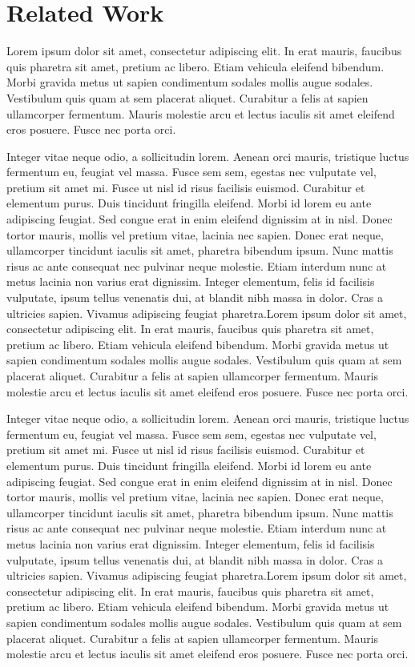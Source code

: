 \section{Related Work}
\label{sec:related_work}

Lorem ipsum dolor sit amet, consectetur adipiscing elit. In erat mauris, faucibus quis pharetra sit amet, pretium ac libero. Etiam vehicula eleifend bibendum. Morbi gravida metus ut sapien condimentum sodales mollis augue sodales. Vestibulum quis quam at sem placerat aliquet. Curabitur a felis at sapien ullamcorper fermentum. Mauris molestie arcu et lectus iaculis sit amet eleifend eros posuere. Fusce nec porta orci.

Integer vitae neque odio, a sollicitudin lorem. Aenean orci mauris, tristique luctus fermentum eu, feugiat vel massa. Fusce sem sem, egestas nec vulputate vel, pretium sit amet mi. Fusce ut nisl id risus facilisis euismod. Curabitur et elementum purus. Duis tincidunt fringilla eleifend. Morbi id lorem eu ante adipiscing feugiat. Sed congue erat in enim eleifend dignissim at in nisl. Donec tortor mauris, mollis vel pretium vitae, lacinia nec sapien. Donec erat neque, ullamcorper tincidunt iaculis sit amet, pharetra bibendum ipsum. Nunc mattis risus ac ante consequat nec pulvinar neque molestie. Etiam interdum nunc at metus lacinia non varius erat dignissim. Integer elementum, felis id facilisis vulputate, ipsum tellus venenatis dui, at blandit nibh massa in dolor. Cras a ultricies sapien. Vivamus adipiscing feugiat pharetra.Lorem ipsum dolor sit amet, consectetur adipiscing elit. In erat mauris, faucibus quis pharetra sit amet, pretium ac libero. Etiam vehicula eleifend bibendum. Morbi gravida metus ut sapien condimentum sodales mollis augue sodales. Vestibulum quis quam at sem placerat aliquet. Curabitur a felis at sapien ullamcorper fermentum. Mauris molestie arcu et lectus iaculis sit amet eleifend eros posuere. Fusce nec porta orci.

Integer vitae neque odio, a sollicitudin lorem. Aenean orci mauris, tristique luctus fermentum eu, feugiat vel massa. Fusce sem sem, egestas nec vulputate vel, pretium sit amet mi. Fusce ut nisl id risus facilisis euismod. Curabitur et elementum purus. Duis tincidunt fringilla eleifend. Morbi id lorem eu ante adipiscing feugiat. Sed congue erat in enim eleifend dignissim at in nisl. Donec tortor mauris, mollis vel pretium vitae, lacinia nec sapien. Donec erat neque, ullamcorper tincidunt iaculis sit amet, pharetra bibendum ipsum. Nunc mattis risus ac ante consequat nec pulvinar neque molestie. Etiam interdum nunc at metus lacinia non varius erat dignissim. Integer elementum, felis id facilisis vulputate, ipsum tellus venenatis dui, at blandit nibh massa in dolor. Cras a ultricies sapien. Vivamus adipiscing feugiat pharetra.Lorem ipsum dolor sit amet, consectetur adipiscing elit. In erat mauris, faucibus quis pharetra sit amet, pretium ac libero. Etiam vehicula eleifend bibendum. Morbi gravida metus ut sapien condimentum sodales mollis augue sodales. Vestibulum quis quam at sem placerat aliquet. Curabitur a felis at sapien ullamcorper fermentum. Mauris molestie arcu et lectus iaculis sit amet eleifend eros posuere. Fusce nec porta orci.

